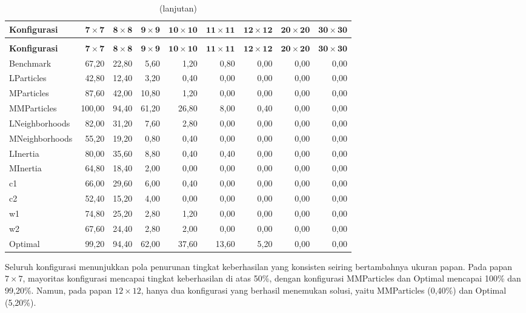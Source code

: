 \begin{longtable}{lrrrrrrrr}
	\caption{Tingkat keberhasilan PSO (\%) per konfigurasi dan ukuran papan}
	\label{tab:pso-sr} \\
	\toprule
	\textbf{Konfigurasi} & $\mathbf{7 \times 7}$ & $\mathbf{8 \times 8}$ & $\mathbf{9 \times 9}$ & $\mathbf{10 \times 10}$ & $\mathbf{11 \times 11}$ & $\mathbf{12 \times 12}$ & $\mathbf{20 \times 20}$ & $\mathbf{30 \times 30}$ \\
	\midrule
	\endfirsthead
	\caption[]{(lanjutan)} \\
	\toprule
	\textbf{Konfigurasi} & $\mathbf{7 \times 7}$ & $\mathbf{8 \times 8}$ & $\mathbf{9 \times 9}$ & $\mathbf{10 \times 10}$ & $\mathbf{11 \times 11}$ & $\mathbf{12 \times 12}$ & $\mathbf{20 \times 20}$ & $\mathbf{30 \times 30}$\\
	\midrule
	\endhead
	\bottomrule
	\endfoot
	Benchmark      & 67,20 & 22,80 &  5,60 &  1,20 & 0,80 & 0,00 & 0,00 & 0,00 \\
	LParticles     & 42,80 & 12,40 &  3,20 &  0,40 & 0,00 & 0,00 & 0,00 & 0,00 \\
	MParticles     & 87,60 & 42,00 & 10,80 &  1,20 & 0,00 & 0,00 & 0,00 & 0,00 \\
	MMParticles    & 100,00 & 94,40 & 61,20 & 26,80 & 8,00 & 0,40 & 0,00 & 0,00 \\
	LNeighborhoods & 82,00 & 31,20 &  7,60 &  2,80 & 0,00 & 0,00 & 0,00 & 0,00 \\
	MNeighborhoods & 55,20 & 19,20 &  0,80 &  0,40 & 0,00 & 0,00 & 0,00 & 0,00 \\
	LInertia       & 80,00 & 35,60 &  8,80 &  0,40 & 0,40 & 0,00 & 0,00 & 0,00 \\
	MInertia       & 64,80 & 18,40 &  2,00 &  0,00 & 0,00 & 0,00 & 0,00 & 0,00 \\
	c1             & 66,00 & 29,60 &  6,00 &  0,40 & 0,00 & 0,00 & 0,00 & 0,00 \\
	c2             & 52,40 & 15,20 &  4,00 &  0,00 & 0,00 & 0,00 & 0,00 & 0,00 \\
	w1             & 74,80 & 25,20 &  2,80 &  1,20 & 0,00 & 0,00 & 0,00 & 0,00 \\
	w2             & 67,60 & 24,40 &  2,80 &  2,00 & 0,00 & 0,00 & 0,00 & 0,00 \\
	Optimal        & 99,20 & 94,40 & 62,00 & 37,60 & 13,60 & 5,20 & 0,00 & 0,00 \\
\end{longtable}

Seluruh konfigurasi menunjukkan pola penurunan tingkat keberhasilan yang konsisten seiring bertambahnya ukuran papan. Pada papan $7 \times 7$, mayoritas konfigurasi mencapai tingkat keberhasilan di atas 50\%, dengan konfigurasi MMParticles dan Optimal mencapai 100\% dan 99,20\%. Namun, pada papan $12 \times 12$, hanya dua konfigurasi yang berhasil menemukan solusi, yaitu MMParticles (0,40\%) dan Optimal (5,20\%).

